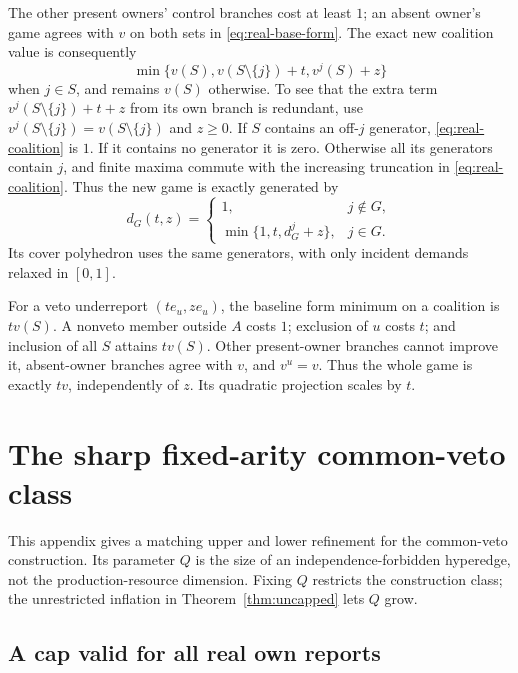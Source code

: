 \documentclass[11pt]{article}
\theoremstyle{definition}
\theoremstyle{remark}
\begin{document}
The other present owners' control branches cost at least $1$; an absent
owner's game agrees with $v$ on both sets in \eqref{eq:real-base-form}.
The exact new coalition value is consequently
\begin{equation}
 \min\{v(S),v(S\setminus\{j\})+t,v^j(S)+z\}
 \label{eq:real-coalition}
\end{equation}
when $j\in S$, and remains $v(S)$ otherwise.  To see that the extra
term $v^j(S\setminus\{j\})+t+z$ from its own branch is redundant, use
$v^j(S\setminus\{j\})=v(S\setminus\{j\})$ and $z\ge0$.
If $S$ contains an off-$j$ generator, \eqref{eq:real-coalition} is $1$.
If it contains no generator it is zero.  Otherwise all its generators
contain $j$, and finite maxima commute with the increasing truncation
in \eqref{eq:real-coalition}.  Thus the new game is exactly generated by
\begin{equation}
 d_G(t,z)=
 \begin{cases}
 1,&j\notin G,\\
 \min\{1,t,d_G^j+z\},&j\in G.
 \end{cases}
 \label{eq:real-generator-demands}
\end{equation}
Its cover polyhedron uses the same generators, with only incident demands
relaxed in $[0,1]$.

For a veto underreport $(t e_u,z e_u)$, the baseline form minimum on a
coalition is $t v(S)$.  A nonveto member outside $A$ costs $1$; exclusion
of $u$ costs $t$; and inclusion of all $S$ attains $t v(S)$.
Other present-owner branches cannot improve it, absent-owner branches
agree with $v$, and $v^u=v$.  Thus the whole game is exactly $tv$,
independently of $z$.  Its quadratic projection scales by $t$.

\section{The sharp fixed-arity common-veto class}
\label{app:sharp-class}

This appendix gives a matching upper and lower refinement for the
common-veto construction.  Its parameter $Q$ is the size of an
independence-forbidden hyperedge, not the production-resource dimension.
Fixing $Q$ restricts the construction class; the unrestricted inflation
in Theorem~\ref{thm:uncapped} lets $Q$ grow.

\subsection{A cap valid for all real own reports}
\end{document}
